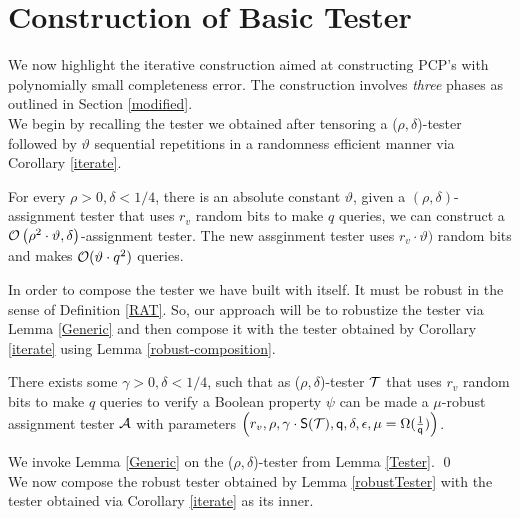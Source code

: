 \section{Construction of Basic Tester}

We now highlight the iterative construction aimed at constructing
PCP's with polynomially small completeness error. The construction
involves {\em three} phases as outlined in Section \ref{modified}.\\

We begin by recalling the tester we obtained after tensoring a
($\rho, \delta$)-tester followed by $\vartheta$ sequential repetitions in a
randomness efficient manner via Corollary \ref{iterate}.

\begin{corollary}
    For every $\rho > 0, \delta < 1/4$, there is an absolute constant $\vartheta$,  given a
$(\rho, \delta)$-assignment tester that uses $r_v$ random bits to make $q$ queries, we can construct a ${\cal O}\left(\rho^2
      \cdot \vartheta , {\delta}\right)$-assignment tester. The new assginment tester 
uses $r_v \cdot  \vartheta)$ random bits and makes ${\cal O}(\vartheta \cdot q^2)$ queries.
\end{corollary}

 In order to compose the tester we have
built with itself.  It must be robust in the sense of Definition
\ref{RAT}. So, our approach will be to robustize the tester via Lemma
\ref{Generic} and then compose it with the tester obtained by
Corollary \ref{iterate} using Lemma \ref{robust-composition}.

\begin{lemma}\label{robustTester}
  There exists some $\gamma > 0, \delta < 1/4$, such that as
  ($\rho, \delta$)-tester ${\cal T}$ that uses $r_v$ random bits to make $q$
  queries to verify a Boolean property $\psi$ can be made a
  $\mu$-robust assignment tester ${\cal A}$ with parameters
  $\left(r_v, \rho, \gamma \cdot {\sf S}({\cal T}), {\sf q}, \delta, \epsilon,
    \mu = \Omega(\frac{1}{{\sf q}})\right)$.
\end{lemma}
 We invoke Lemma \ref{Generic} on the
($\rho,\delta$)-tester from Lemma \ref{Tester}. \qed \\ 

 We now compose the robust tester
obtained by Lemma \ref{robustTester} with the tester obtained via
Corollary \ref{iterate} as its inner.

